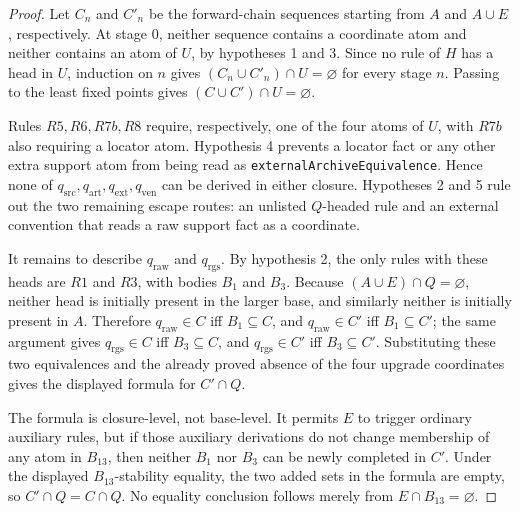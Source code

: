 \documentclass[runningheads]{llncs}
\newcommand{\rawBeginTokenCoord}{q_{\mathrm{raw}}}
\newcommand{\qlex}{\rawBeginTokenCoord}
\newcommand{\qrgs}{q_{\mathrm{rgs}}}
\newcommand{\qsrc}{q_{\mathrm{src}}}
\newcommand{\qart}{q_{\mathrm{art}}}
\newcommand{\qext}{q_{\mathrm{ext}}}
\newcommand{\qven}{q_{\mathrm{ven}}}
\begin{document}
\begin{proof}
Let \(C_n\) and \(C'_n\) be the forward-chain sequences starting from \(A\) and
\(A\cup E\), respectively.  At stage \(0\), neither sequence contains a
coordinate atom and neither contains an atom of \(U\), by hypotheses 1 and 3.
Since no rule of \(H\) has a head in \(U\), induction on \(n\) gives
\((C_n\cup C'_n)\cap U=\varnothing\) for every stage \(n\).  Passing to the least
fixed points gives \((C\cup C')\cap U=\varnothing\).

Rules \(R5,R6,R7b,R8\) require, respectively, one of the four atoms of \(U\),
with \(R7b\) also requiring a locator atom.  Hypothesis 4 prevents a locator fact
or any other extra support atom from being read as
\texttt{externalArchiveEquivalence}.  Hence none of
\(\qsrc,\qart,\qext,\qven\) can be derived in either closure.  Hypotheses 2 and
5 rule out the two remaining escape routes: an unlisted \(Q\)-headed rule and an
external convention that reads a raw support fact as a coordinate.

It remains to describe \(\qlex\) and \(\qrgs\).  By hypothesis 2, the only rules
with these heads are \(R1\) and \(R3\), with bodies \(B_1\) and \(B_3\).  Because
\((A\cup E)\cap Q=\varnothing\), neither head is initially present in the larger
base, and similarly neither is initially present in \(A\).  Therefore
\(\qlex\in C\) iff \(B_1\subseteq C\), and
\(\qlex\in C'\) iff \(B_1\subseteq C'\); the same argument gives
\(\qrgs\in C\) iff \(B_3\subseteq C\), and
\(\qrgs\in C'\) iff \(B_3\subseteq C'\).  Substituting these two equivalences and
the already proved absence of the four upgrade coordinates gives the displayed
formula for \(C'\cap Q\).

The formula is closure-level, not base-level.  It permits \(E\) to trigger
ordinary auxiliary rules, but if those auxiliary derivations do not change
membership of any atom in \(B_{13}\), then neither \(B_1\) nor \(B_3\) can be
newly completed in \(C'\).  Under the displayed \(B_{13}\)-stability equality,
the two added sets in the formula are empty, so \(C'\cap Q=C\cap Q\).
No equality conclusion follows merely from \(E\cap B_{13}=\varnothing\).
\end{proof}
\end{document}
